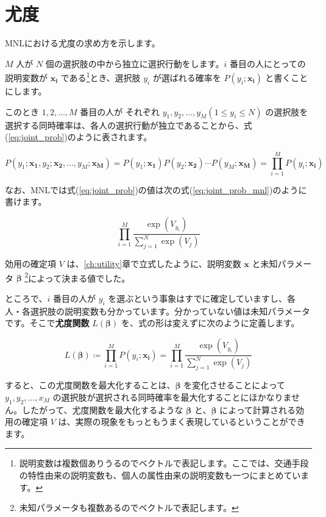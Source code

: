 \section{尤度}\label{sec:likelihood}

MNLにおける尤度の求め方を示します。

$M$ 人が $N$ 個の選択肢の中から独立に選択行動をします。$i$ 番目の人にとっての説明変数が $\bm{x_i}$ である\footnote{説明変数は複数個ありうるのでベクトルで表記します。ここでは、交通手段の特性由来の説明変数も、個人の属性由来の説明変数も一つにまとめています。}とき、選択肢 $y_i$ が選ばれる確率を $P(y_i;\bm{x_i})$ と書くことにします。

このとき $1,2,\ldots,M$ 番目の人が それぞれ $y_1,y_2,\ldots,y_M (1 \le y_i \le N)$ の選択肢を選択する同時確率は、各人の選択行動が独立であることから、式(\ref{eq:joint_prob})のように表されます。

\begin{equation}
    \label{eq:joint_prob}
    P(y_1;\bm{x_1},y_2;\bm{x_2},\ldots,y_M;\bm{x_M}) = P(y_1;\bm{x_1})P(y_2;\bm{x_2}) \cdots P(y_M;\bm{x_M}) = \prod_{i=1}^M P(y_i;\bm{x_i})
\end{equation}

なお、MNLでは式(\ref{eq:joint_prob})の値は次の式(\ref{eq:joint_prob_mnl})のように書けます。

\begin{equation}
    \label{eq:joint_prob_mnl}
    \prod_{i=1}^M\frac{\exp(V_{y_i})}{\sum_{j=1}^N \exp(V_j)}
\end{equation}

効用の確定項 $V$ は、\ref{ch:utility}章で立式したように、説明変数 $\bm x$ と未知パラメータ $\bm\beta$ \footnote{未知パラメータも複数あるのでベクトルで表記します。}によって決まる値でした。

ところで、$i$ 番目の人が $y_i$ を選ぶという事象はすでに確定していますし、各人・各選択肢の説明変数も分かっています。分かっていない値は未知パラメータです。そこで\textbf{尤度関数} $L(\bm\beta)$ を、式の形は変えずに次のように定義します。

\begin{equation}
    \label{eq:likelihood}
    L(\bm\beta) \coloneq \prod_{i=1}^M P(y_i;\bm{x_i}) = \prod_{i=1}^M\frac{\exp(V_{y_i})}{\sum_{j=1}^N \exp(V_j)}
\end{equation}

すると、この尤度関数を最大化することは、$\bm\beta$ を変化させることによって $y_1,y_2,\ldots,x_M$ の選択肢が選択される同時確率を最大化することにほかなりません。したがって、尤度関数を最大化するような $\bm\beta$ と、$\bm\beta$ によって計算される効用の確定項 $V$ は、実際の現象をもっともうまく表現しているということができます。

